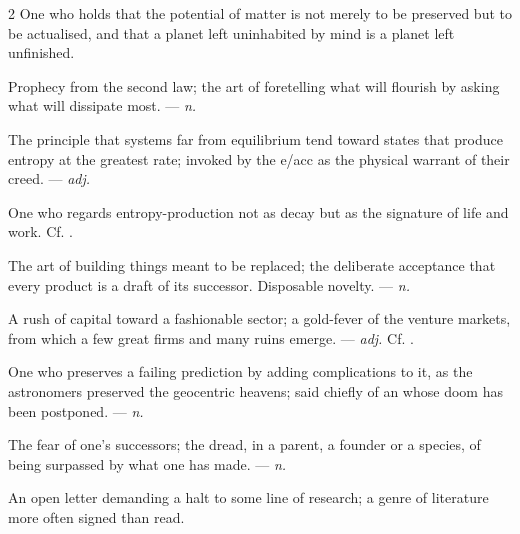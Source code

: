 \begin{multicols}{2}
 One who holds that the potential of matter is not merely to be preserved but to be actualised, and that a planet left uninhabited by mind is a planet left unfinished.

 Prophecy from the second law; the art of foretelling what will flourish by asking what will dissipate most. —  \textit{n.}

 The principle that systems far from equilibrium tend toward states that produce entropy at the greatest rate; invoked by the e/acc as the physical warrant of their creed. —  \textit{adj.}

 One who regards entropy-production not as decay but as the signature of life and work.  Cf. .

  The art of building things meant to be replaced; the deliberate acceptance that every product is a draft of its successor.   Disposable novelty.  —  \textit{n.}

 A rush of capital toward a fashionable sector; a gold-fever of the venture markets, from which a few great firms and many ruins emerge.   —  \textit{adj.} Cf. .

  One who preserves a failing prediction by adding complications to it, as the astronomers preserved the geocentric heavens; said chiefly of an  whose doom has been postponed. —  \textit{n.}

 The fear of one's successors; the dread, in a parent, a founder or a species, of being surpassed by what one has made. —  \textit{n.}

 An open letter demanding a halt to some line of research; a genre of literature more often signed than read.  


\end{multicols}
